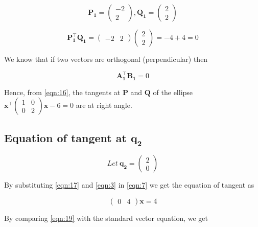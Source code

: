 \documentclass[journal,10pt,twocolumn]{article}
\let\vec\mathbf
\newcommand{\myvec}[1]{\ensuremath{\begin{pmatrix}#1\end{pmatrix}}}
\begin{document}
    \begin{equation}
    \label{eqn:15}
        \vec{P_1} = \myvec{-2 \\ 2} , \vec{Q_1} = \myvec{2 \\ 2}
    \end{equation}
        
    \begin{equation}
    \label{eqn:16}
        \vec{P_1^\top}\vec{Q_1} = \myvec{-2 & 2}\myvec{2 \\ 2} = -4 + 4 = 0
    \end{equation}
    
    \begin{flushleft}
        We know that if two vectors are orthogonal (perpendicular) then
    \end{flushleft}
    
    \begin{equation}
    \label{eqn:17}
        \vec{A_1^\top}\vec{B_1} = 0
    \end{equation}
    
    \begin{flushleft}
        Hence, from \eqref{eqn:16}, the tangents at $\vec{P}$ and $\vec{Q}$ of the ellipse $\vec{x^\top}\myvec{1 & 0 \\ 0 & 2}\vec{x} - 6 = 0$ are at right angle.
    \end{flushleft}
    
        \subsection{Equation of tangent at $\vec{q_2}$}
    \begin{equation}
    \label{eqn:18}
        Let \ \vec{q_2} = \myvec{2 \\ 0}
    \end{equation}
    
    \begin{flushleft}
        By substituting \eqref{eqn:17} and \eqref{eqn:3} in \eqref{eqn:7} we get the equation of tangent as
    \end{flushleft}
    
    \begin{equation}
    \label{eqn:19}
        \myvec{0 & 4}\vec{x} = 4
    \end{equation}
    
    \begin{flushleft}
        By comparing \eqref{eqn:19} with the standard vector equation, we get 
    \end{flushleft}
    
\end{document}
